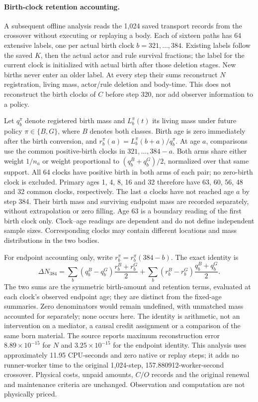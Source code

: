 \paragraph{Birth-clock retention accounting.}A subsequent offline analysis reads the 1,024 saved transport records from the crossover without executing or replaying a body. Each of sixteen paths has 64 extensive labels, one per actual birth clock $b=321,\ldots,384$. Existing labels follow the saved $K$, then the actual actor and rule survival fractions; the label for the current clock is initialized with actual birth after those deletion stages. New births never enter an older label. At every step their sums reconstruct $N$ registration, living mass, actor/rule deletion and body-time. This does not reconstruct the birth clocks of $C$ before step 320, nor add observer information to a policy.

Let $q_b^\pi$ denote registered birth mass and $L_b^\pi(t)$ its living mass under future policy $\pi\in\{B,G\}$, where $B$ denotes both classes. Birth age is zero immediately after the birth conversion, and $r_b^\pi(a)=L_b^\pi(b+a)/q_b^\pi$. At age $a$, comparisons use the common positive-birth clocks in $321,\ldots,384-a$. Both arms share either weight $1/n_a$ or weight proportional to $(q_b^B+q_b^G)/2$, normalized over that same support. All 64 clocks have positive birth in both arms of each pair; no zero-birth clock is excluded. Primary ages 1, 4, 8, 16 and 32 therefore have 63, 60, 56, 48 and 32 common clocks, respectively. The last $a$ clocks have not reached age $a$ by step 384. Their birth mass and surviving endpoint mass are recorded separately, without extrapolation or zero filling. Age 63 is a boundary reading of the first birth clock only. Clock--age readings are dependent and do not define independent sample sizes. Corresponding clocks may contain different locations and mass distributions in the two bodies.

For endpoint accounting only, write $r_b^\pi=r_b^\pi(384-b)$. The exact identity is
\begin{equation}
\Delta N_{384}=\sum_b (q_b^B-q_b^G)\frac{r_b^B+r_b^G}{2}
+\sum_b (r_b^B-r_b^G)\frac{q_b^B+q_b^G}{2}.
\end{equation}
The two sums are the symmetric birth-amount and retention terms, evaluated at each clock's observed endpoint age; they are distinct from the fixed-age summaries. Zero denominators would remain undefined, with unmatched mass accounted for separately; none occurs here. The identity is arithmetic, not an intervention on a mediator, a causal credit assignment or a comparison of the same born material. The source reports maximum reconstruction error $8.89\times10^{-15}$ for $N$ and $3.25\times10^{-15}$ for the endpoint identity. This analysis uses approximately 11.95 CPU-seconds and zero native or replay steps; it adds no runner-worker time to the original 1,024-step, 157.880912-worker-second crossover. Physical costs, unpaid amounts, $C/O$ records and the original renewal and maintenance criteria are unchanged. Observation and computation are not physically priced.

